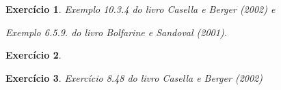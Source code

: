 \documentclass[letter,11pt]{article}
\newtheorem{exer}{Exercício}
\begin{document}
\begin{exer} \rm
Exemplo 10.3.4 do livro Casella e Berger (2002) e 

Exemplo 6.5.9. do livro Bolfarine e Sandoval (2001).
\end{exer}


\begin{exer} \rm

\end{exer}


\begin{exer} \rm
Exercício 8.48 do livro Casella e Berger (2002)

\end{exer}
\end{document}
